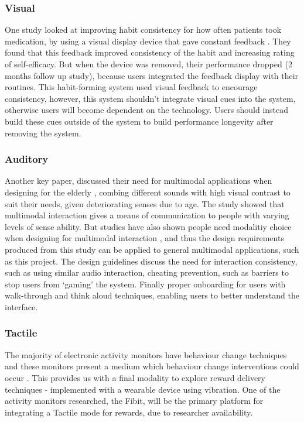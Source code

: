 \subsubsection*{Visual}
One study looked at improving habit consistency for how often patients took medication, by using a visual display device that gave constant feedback \cite{article_realtime_feedback_improving_medication_taking}. They found that this feedback improved consistency of the habit and increasing rating of self-efficacy. But when the device was removed, their performance dropped (2 months follow up study), because users integrated the feedback display with their routines. This habit-forming system used visual feedback to encourage consistency, however, this system shouldn't integrate visual cues into the system, otherwise users will become dependent on the technology. Users should instead build these cues outside of the system to build performance longevity after removing the system.

\subsubsection*{Auditory}
Another key paper, discussed their need for multimodal applications when designing for the elderly \cite{article_movipill_improving_medication_elders}, combing different sounds with high visual contrast to suit their needs, given deteriorating senses due to age. The study showed that multimodal interaction gives a means of communication to people with varying levels of sense ability. But studies have also shown people need modalitiy choice when designing for multimodal interaction \cite{article_user_centred_multimodal_reminders}, and thus the design requirements produced from this study can be applied to general multimodal applications, such as this project. The design guidelines discuss the need for interaction consistency, such as using similar audio interaction, cheating prevention, such as barriers to stop users from `gaming' the system. Finally proper onboarding for users with walk-through and think aloud techniques, enabling users to better understand the interface.

\subsubsection*{Tactile}
The majority of electronic activity monitors have behaviour change techniques and these monitors present a medium which behaviour change interventions could occur \cite{article_wearable_good}. This provides us with a final modality to explore reward delivery techniques - implemented with a wearable device using vibration. One of the activity monitors researched, the Fibit, will be the primary platform for integrating a Tactile mode for rewards, due to researcher availability.


